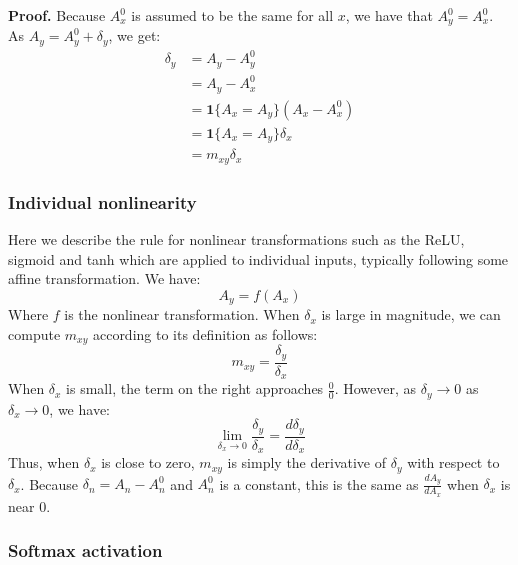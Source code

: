 \documentclass{article}
\begin{document}
{\bf Proof.} Because $A_x^0$ is assumed to be the same for all $x$, we have that $A_y^0 = A_x^0$. As $A_y = A_y^0 + \delta_y$, we get:
\begin{equation}
\begin{aligned}
\delta_y &= A_y - A_y^0\\
             &= A_y - A_x^0\\
             &= \bm{1}\{A_x = A_y\} (A_x - A_x^0)\\
             &= \bm{1}\{A_x = A_y\} \delta_x\\
             &= m_{xy} \delta_x
\end{aligned}
\end{equation}

\subsubsection{Individual nonlinearity}

Here we describe the rule for nonlinear transformations such as the ReLU, sigmoid and tanh which are applied to individual inputs, typically following some affine transformation. We have:
\begin{equation}
A_y = f(A_x)
\end{equation}
Where $f$ is the nonlinear transformation. When $\delta_x$ is large in magnitude, we can compute $m_{xy}$ according to its definition as follows:
\begin{equation}
m_{xy} = \frac{\delta_y}{\delta_x}
\end{equation}
When $\delta_x$ is small, the term on the right approaches $\frac{0}{0}$. However, as $\delta_y \rightarrow 0$ as $\delta_x \rightarrow 0$, we have:
\begin{equation}
\lim_{\delta_x \rightarrow 0} \frac{\delta_y}{\delta_x} = \frac{d \delta_y}{d \delta_x}
\end{equation}
Thus, when $\delta_x$ is close to zero, $m_{xy}$ is simply the derivative of $\delta_y$ with respect to $\delta_x$. Because $\delta_n = A_n - A_n^0$ and $A_n^0$ is a constant, this is the same as $\frac{dA_y}{dA_x}$ when $\delta_x$ is near $0$.

\subsubsection{Softmax activation}
\end{document}
